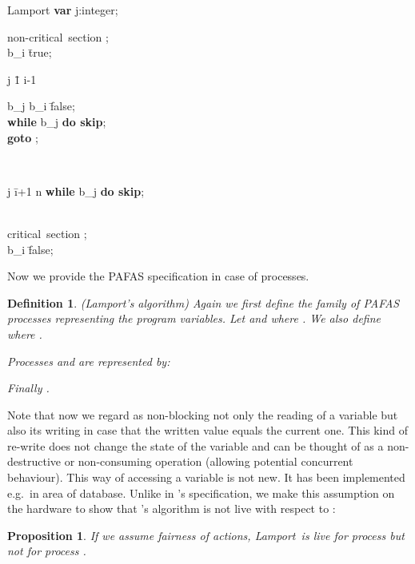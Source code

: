 \documentclass[copyright,creativecommons]{eptcs}
\newtheorem{definition}[theorem]{Definition}
\newtheorem{proposition}[theorem]{Proposition}
\newcommand{\lamporta}{{\sf Lamport}} \newcommand{\lamportb}{\lamporta}
\begin{document}
\vspace{0.15cm}
\small
\begin{algorithm}{Lamport}{}
{\bf var} \; j:integer;\\
\begin{WHILE}{}
\langle \mbox{non-critical section} \rangle; \\
b_i \= true;\\
\begin{FOR}{j \= 1 \TO i-1}
\begin{IF}{b_j}
b_i \= false; \\
{\bf while} \; b_j \; {\bf do \; skip};\\
{\bf goto} ;
\end{IF}
\end{FOR}\\
\begin{FOR}{j \= i+1 \TO n}
{\bf while} \; b_j \; {\bf do \; skip};
\end{FOR}\\
\langle \mbox{critical section} \rangle; \\
b_i \= false;
\end{WHILE}
\end{algorithm}
\normalsize
Now we provide the PAFAS specification in case of  processes.
\begin{definition}\label{lamp-algo1}\rm({\em Lamport's algorithm})
Again we first define the family of PAFAS processes representing the
program variables. Let  and  where .
We also define  where . 

\noindent Processes  and  are represented by:



\noindent
Finally . 
\end{definition}
Note that now we regard as non-blocking not only the reading of a variable
but also its writing in case that the  written value equals the current
one. This kind of re-write does not change the state of the variable and 
can be thought of as a non-destructive or non-consuming operation (allowing
potential concurrent behaviour). This way of accessing a variable is not
new. It has been implemented e.g.\ in area of database. Unlike in 's specification, we make this assumption on the hardware to show that 's algorithm is not live with respect to :


\begin{proposition}\label{prop:lamp-live}
If we assume fairness of actions, \lamporta\ is live for process
 but {\em not} for process . 
\end{proposition}
\end{document}
